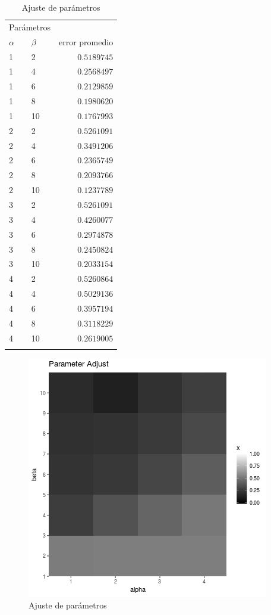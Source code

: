 \documentclass[10pt, a4paper, twocolumn]{article} %
\begin{document}
\begin{table}
	\caption{Ajuste de parámetros}
	\centering
	\begin{tabular}{llr}
		\toprule
		\multicolumn{2}{c}{Parámetros} \\
		\cmidrule(r){1-2}
		$\alpha$ & $\beta$ & error promedio \\
		\midrule
		1 & 2 & $0.5189745$ \\
		1 & 4 & $0.2568497$ \\
		1 & 6 & $0.2129859$ \\
		1 & 8 & $0.1980620$ \\
		1 & 10 & $0.1767993$ \\
		2 & 2 & $0.5261091$ \\
		2 & 4 & $0.3491206$ \\
		2 & 6 & $0.2365749$ \\
		2 & 8 & $0.2093766$ \\
		2 & 10 & $0.1237789$ \\
		3 & 2 & $0.5261091$ \\
		3 & 4 & $0.4260077$ \\
		3 & 6 & $0.2974878$ \\
		3 & 8 & $0.2450824$ \\
		3 & 10 & $0.2033154$ \\
		4 & 2 & $0.5260864$ \\
		4 & 4 & $0.5029136$ \\
		4 & 6 & $0.3957194$ \\
		4 & 8 & $0.3118229$ \\
		4 & 10 & $0.2619005$ \\
		\bottomrule
		\label{tab:ajuste1}
	\end{tabular}
\end{table}

\begin{figure}
	\includegraphics[width=\linewidth]{param_adjust.png} %
	\caption{Ajuste de parámetros} %
	\label{fig:ajuste1} %
\end{figure}
\end{document}
